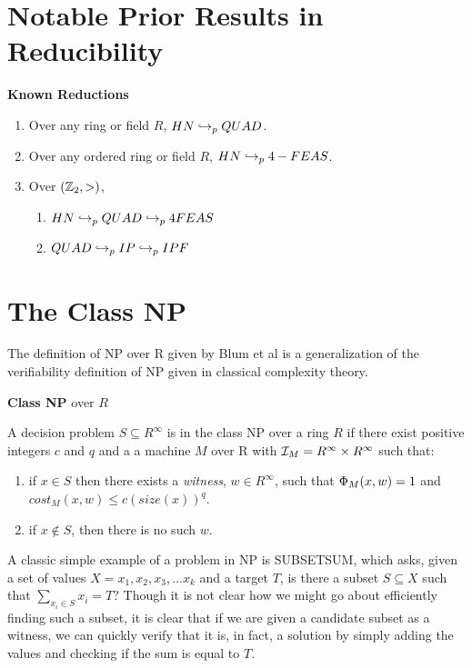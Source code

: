 \section{Notable Prior Results in Reducibility}

\begin{theorem}{\textbf{Known Reductions}}
  \begin{enumerate}
  \item Over any ring or field $R$, $HN \hookrightarrow_p QUAD$.
  \item Over any ordered ring or field $R$, $HN \hookrightarrow_p 4-FEAS$.
  \item Over $(\mathbb{Z}_2, >)$, 
    \begin{enumerate}
    \item $HN \hookrightarrow_p QUAD \hookrightarrow_p 4FEAS$
    \item $QUAD \hookrightarrow_p IP \hookrightarrow_p IPF$
    \end{enumerate}
  \end{enumerate}
\end{theorem}

\section{The Class NP}

The definition of NP over R given by Blum et al is a generalization of
the verifiability definition of NP given in classical complexity theory.

\begin{definition}{\textbf{Class NP} over $R$}

  A decision problem $S \subseteq R^\infty$ is in the class NP over a
  ring $R$ if there exist positive integers $c$ and $q$ and a a
  machine $M$ over R with $\mathcal{I}_M = R^\infty \times R^\infty$ such
  that:

  \begin{enumerate}
  \item if $x \in S$ then there exists a \emph{witness}, $w
    \in R^\infty$, such that $\Phi_M(x,w) = 1$ and
    $cost_M(x,w) \leq c(size(x))^q$.
  \item if $x \notin S$, then there is no such $w$.
  \end{enumerate}
\end{definition}

A classic simple example of a problem in NP is SUBSETSUM, which asks,
given a set of values $X = {x_1, x_2, x_3, \ldots x_k}$ and a target
$T$, is there a subset $S \subseteq X$ such that $\sum\limits_{x_i \in
  S} x_i = T$?  Though it is not clear how we might go about
efficiently finding such a subset, it is clear that if we are given a
candidate subset as a witness, we can quickly verify that it is, in
fact, a solution by simply adding the values and checking if the sum
is equal to $T$.\\

